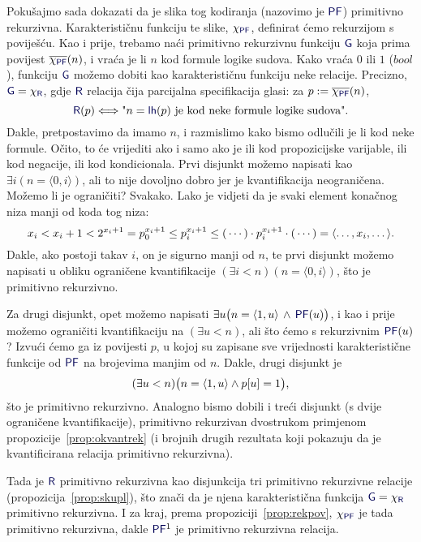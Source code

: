 \begin{primjer}
Pokušajmo sada dokazati da je slika tog kodiranja (nazovimo je $\f{PF}$) primitivno rekurzivna. Karakterističnu funkciju te slike, $\chi_{\f{PF}}$, definirat ćemo rekurzijom s poviješću. Kao i prije, trebamo naći primitivno rekurzivnu funkciju $\f G$ koja prima povijest $\overline{\chi_{\f{PF}}}(n)$, i vraća je li $n$ kod formule logike sudova. Kako vraća $0$ ili $1$ ($bool$), funkciju $\f G$ možemo dobiti kao karakterističnu funkciju neke relacije. Precizno, $\f G=\chi_{\f R}$, gdje $\f R$ relacija čija parcijalna specifikacija glasi: za $p:=\overline{\chi_{\f{PF}}}(n)$,
\begin{equation}
    \f R(p)\Longleftrightarrow\text{"$n=\f{lh}(p)$ je kod neke formule logike sudova".}
\end{equation}
Dakle, pretpostavimo da imamo $n$, i razmislimo kako bismo odlučili je li kod neke formule. Očito, to će vrijediti ako i samo ako je ili kod propozicijske varijable, ili kod negacije, ili kod kondicionala. Prvi disjunkt možemo napisati kao $\exists i(n=\langle0,i\rangle)$, ali to nije dovoljno dobro jer je kvantifikacija neograničena. Možemo li je ograničiti? Svakako. Lako je vidjeti da je svaki element konačnog niza manji od koda tog niza:
\begin{equation}\label{eq:elem<kod}
    x_i<x_i+1<2^{x_i+1}=p_0^{x_i+1}\le p_i^{x_i+1}\le(\,\dotsm)\cdot p_i^{x_i+1}\cdot(\,\dotsm)=\langle\dotsc,x_i,\dotsc\rangle\text.
\end{equation}
Dakle, ako postoji takav $i$, on je sigurno manji od $n$, te prvi disjunkt možemo napisati u obliku ograničene kvantifikacije $(\exists i<n)(n=\langle0,i\rangle)$, što je primitivno rekurzivno.

Za drugi disjunkt, opet možemo napisati $\exists u\bigl(n=\langle1,u\rangle\,\land\,\f{PF}(u)\bigr)$, i kao i prije možemo ograničiti kvantifikaciju na $(\exists u<n)$, ali što ćemo s rekurzivnim $\f{PF}(u)$? Izvući ćemo ga iz povijesti $p$, u kojoj su zapisane sve vrijednosti karakteristične funkcije od $\f{PF}$ na brojevima manjim od $n$. Dakle, drugi disjunkt je
\begin{equation}
    (\exists u<n)\bigl(n=\langle1,u\rangle\land p[u]=1\bigr)\text,
\end{equation}
što je primitivno rekurzivno. Analogno bismo dobili i treći disjunkt (s dvije ograničene kvantifikacije),  primitivno rekurzivan dvostrukom primjenom propozicije~\ref{prop:okvantrek} (i brojnih drugih rezultata koji pokazuju da je kvantificirana relacija primitivno rekurzivna).

Tada je $\f R$ primitivno rekurzivna kao disjunkcija tri primitivno rekurzivne relacije (propozicija~\ref{prop:skupl}), što znači da je njena karakteristična funkcija $\f G=\chi_{\f R}$ primitivno rekurzivna. I za kraj, prema propoziciji~\ref{prop:rekpov}, $\chi_{\f{PF}}$ je tada primitivno rekurzivna, dakle $\f{PF}^1$ je primitivno rekurzivna relacija.
\end{primjer}

